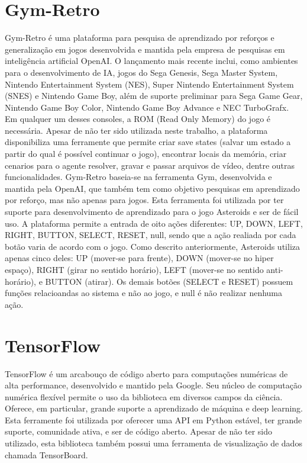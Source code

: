 \section{Gym-Retro}
\label{sec:gymretro}

Gym-Retro é uma plataforma para pesquisa de aprendizado por reforços e generalização em jogos desenvolvida e mantida pela empresa de pesquisas em inteligência artificial OpenAI. O lançamento mais recente inclui, como ambientes para o desenvolvimento de IA, jogos do Sega Genesis, Sega Master System, Nintendo Entertainment System (NES), Super Nintendo Entertainment System (SNES) e Nintendo Game Boy, além de suporte preliminar para Sega Game Gear, Nintendo Game Boy Color, Nintendo Game Boy Advance e NEC TurboGrafx. Em qualquer um desses consoles, a ROM (Read Only Memory) do jogo é necessária.
Apesar de não ter sido utilizada neste trabalho, a plataforma disponibiliza uma ferramente que permite criar save states (salvar um estado a partir do qual é possível continuar o jogo), encontrar locais da memória, criar cenarios para o agente resolver, gravar e passar arquivos de vídeo, dentre outras funcionalidades.
Gym-Retro baseia-se na ferramenta Gym, desenvolvida e mantida pela OpenAI, que também tem como objetivo pesquisas em aprendizado por reforço, mas não apenas para jogos.
Esta ferramenta foi utilizada por ter suporte para desenvolvimento de aprendizado para o jogo Asteroids e ser de fácil uso. A plataforma permite a entrada de oito ações diferentes: UP, DOWN, LEFT, RIGHT, BUTTON, SELECT, RESET, null, sendo que a ação realiada por cada botão varia de acordo com o jogo. Como descrito anteriormente, Asteroids utiliza apenas cinco deles: UP (mover-se para frente), DOWN (mover-se no hiper espaço), RIGHT (girar no sentido horário), LEFT (mover-se no sentido anti-horário), e BUTTON (atirar). Os demais botões (SELECT e RESET) possuem funções relacioandas ao sistema e não ao jogo, e null é não realizar nenhuma ação.

\section{TensorFlow}
\label{sec:tensorflow}

TensorFlow é um arcabouço de código aberto para computações numéricas de alta performance, desenvolvido e mantido pela Google. Seu núcleo de computação numérica flexível permite o uso da biblioteca em diversos campos da ciência. Oferece, em particular, grande suporte a aprendizado de máquina e deep learning.
Esta ferramente foi utilizada por oferecer uma API em Python estável, ter grande suporte, comunidade ativa, e ser de código aberto.
Apesar de não ter sido utilizado, esta biblioteca também possui uma ferramenta de visualização de dados chamada TensorBoard.

